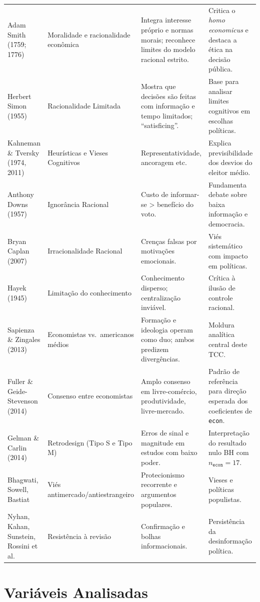 \begin{apendicesenv}
{\begin{longtable}{p{} p{} p{} p{}}
 Adam Smith (1759; 1776) & Moralidade e racionalidade econômica & Integra interesse próprio e normas morais; reconhece limites do modelo racional estrito. & Critica o \textit{homo economicus} e destaca a ética na decisão pública. \\
 Herbert Simon (1955) & Racionalidade Limitada & Mostra que decisões são feitas com informação e tempo limitados; ``satisficing''. & Base para analisar limites cognitivos em escolhas políticas. \\
 Kahneman \& Tversky (1974, 2011) & Heurísticas e Vieses Cognitivos & Representatividade, ancoragem etc. & Explica previsibilidade dos desvios do eleitor médio. \\
 Anthony Downs (1957) & Ignorância Racional & Custo de informar-se > benefício do voto. & Fundamenta debate sobre baixa informação e democracia. \\
 Bryan Caplan (2007) & Irracionalidade Racional & Crenças falsas por motivações emocionais. & Viés sistemático com impacto em políticas. \\
 Hayek (1945) & Limitação do conhecimento & Conhecimento disperso; centralização inviável. & Crítica à ilusão de controle racional. \\
 Sapienza \& Zingales (2013) & Economistas vs.\ americanos médios & Formação e ideologia operam como duo; ambos predizem divergências. & Moldura analítica central deste TCC. \\
 Fuller \& Geide-Stevenson (2014) & Consenso entre economistas & Amplo consenso em livre-comércio, produtividade, livre-mercado. & Padrão de referência para direção esperada dos coeficientes de \texttt{econ}. \\
 Gelman \& Carlin (2014) & Retrodesign (Tipo S e Tipo M) & Erros de sinal e magnitude em estudos com baixo poder. & Interpretação do resultado nulo BH com $n_{\texttt{econ}} = 17$. \\
 Bhagwati, Sowell, Bastiat & Viés antimercado/antiestrangeiro & Protecionismo recorrente e argumentos populares. & Vieses e políticas populistas. \\
 Nyhan, Kahan, Sunstein, Rossini et al. & Resistência à revisão & Confirmação e bolhas informacionais. & Persistência da desinformação política. \\
 \end{longtable}
}

\chapter{Variáveis Analisadas}
\label{apendice:variaveis_analisadas}


\end{apendicesenv}
